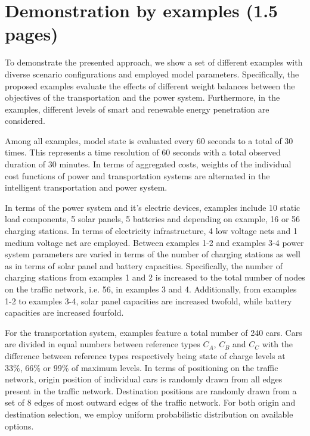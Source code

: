 \section{Demonstration by examples (1.5 pages)}
\label{section:evaluation}

To demonstrate the presented approach, we show a set of different examples with diverse scenario configurations and employed model parameters. Specifically, the proposed examples evaluate the effects of different weight balances between the objectives of the transportation and the power system. 
Furthermore, in the examples, different levels of smart and renewable energy penetration are considered. 


Among all examples, model state is evaluated every 60 seconds to a total of 30 times. This represents a time resolution of 60 seconds with a total observed duration of 30 minutes. 
In terms of aggregated costs, weights of the individual cost functions of power and transportation systems are alternated in the intelligent transportation and power system.

In terms of the power system and it's electric devices, examples include 10 static load components, 5 solar panels, 5 batteries and depending on example, 16 or 56 charging stations. In terms of electricity infrastructure, 4 low voltage nets and 1 medium voltage net are employed. Between examples 1-2 and examples 3-4 power system parameters are varied in terms of the number of charging stations as well as in terms of solar panel and battery capacities. Specifically, the number of charging stations from examples 1 and 2 is increased to the total number of nodes on the traffic network, i.e. 56, in examples 3 and 4. Additionally, from examples 1-2 to examples 3-4, solar panel capacities are increased twofold, while battery capacities are increased fourfold. 

For the transportation system, examples feature a total number of 240 cars. Cars are divided in equal numbers between reference types $C_{A}$, $C_{B}$ and $C_{C}$ with the difference between reference types respectively being state of charge levels at 33\%, 66\% or 99\% of maximum levels. In terms of positioning on the traffic network, origin position of individual cars is randomly drawn from all edges present in the traffic network. Destination positions are randomly drawn from a set of 8 edges of most outward edges of the traffic network. For both origin and destination selection, we employ uniform probabilistic distribution on available options. 

